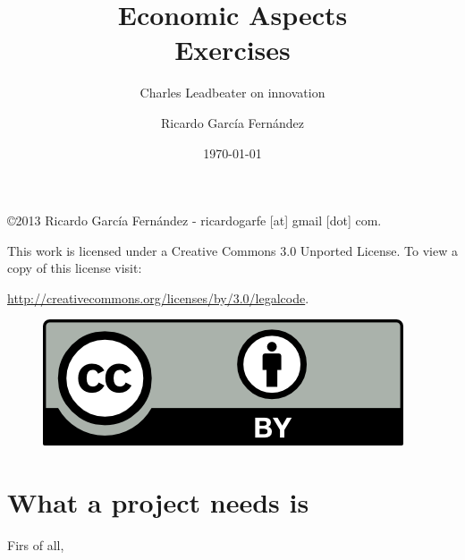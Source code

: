 \documentclass[11pt]{scrartcl}
\title{\textbf{Economic Aspects\\
                Exercises}}
\subtitle{Charles Leadbeater on innovation}
\author{Ricardo Garc\'ia Fern\'andez}
\date{\today}
\begin{document}
\maketitle

\vfill

\begin{flushright}
    \copyright  2013 Ricardo Garc\'ia Fern\'andez - ricardogarfe [at] gmail [dot] com.

    This work is licensed under a Creative Commons 3.0 Unported License.
    To view a copy of this license visit:
 
    \url{http://creativecommons.org/licenses/by/3.0/legalcode}.
\end{flushright}

\begin{figure}[h]
    \begin{flushright}	
        \includegraphics{by}
        \label{fig:by}
    \end{flushright}
\end{figure}

\newpage

\section{What a project needs is}

Firs of all, 
\end{document}
